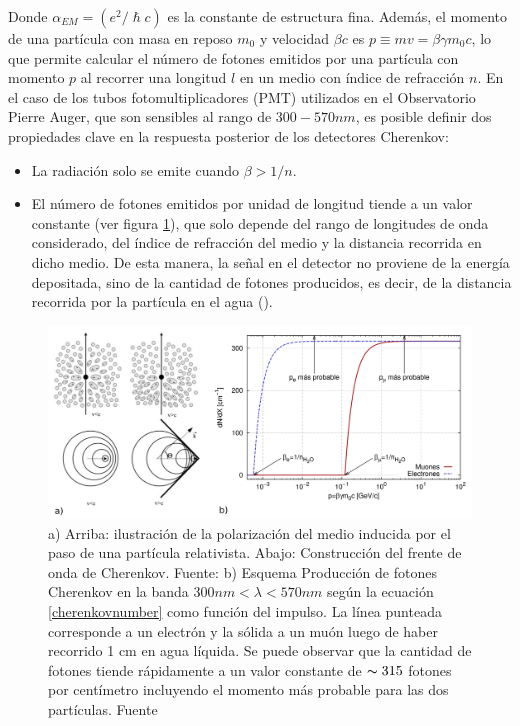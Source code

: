Donde $\alpha_{EM}=(e^2/ \hslash c)$ es la constante de estructura fina. Además, el momento de una partícula con masa en reposo $m_{0}$ y velocidad $\beta c$ es $p\equiv mv = \beta \gamma m_{0}c$, lo que permite calcular el número de fotones emitidos por una partícula con momento $p$ al recorrer una longitud $l$ en un medio con índice de refracción $n$. En el caso de los tubos fotomultiplicadores (PMT) utilizados en el Observatorio Pierre Auger, que son sensibles al rango de $300 - 570nm$, es posible definir dos propiedades clave en la respuesta posterior de los detectores Cherenkov:
\begin{itemize}
\item La radiación solo se emite cuando $\beta>1/n$.
\item El número de fotones emitidos por unidad de longitud tiende a un valor constante (ver figura \ref{stopping_cherenkov}), que solo depende del rango de longitudes de onda considerado, del índice de refracción del medio y la distancia recorrida en dicho medio. De esta manera, la señal en el detector no proviene de la energía depositada, sino de la cantidad de fotones producidos, es decir, de la distancia recorrida por la partícula en el agua (\cite{asorey_2012}).
\end{itemize}
\begin{figure}
\centering
\includegraphics[width=1\textwidth]{Figs/cherenkov_stopping.png}
\caption{a) Arriba: ilustración de la polarización del medio inducida por el paso de una partícula relativista. Abajo: Construcción del frente de onda de Cherenkov. Fuente: \cite{deNaurois:2015oda} b) Esquema Producción de fotones Cherenkov en la banda $300 nm < \lambda < 570 nm$ según la ecuación \ref{cherenkovnumber} como función del impulso. La línea punteada corresponde a un electrón y la sólida a un muón luego de haber recorrido 1 cm en agua líquida. Se puede observar que la cantidad de fotones tiende rápidamente a un valor constante de $\thicksim 315$ fotones por centímetro incluyendo el momento más probable para las dos partículas. Fuente \cite{asorey_2012}}
\label{stopping_cherenkov}
\end{figure}
